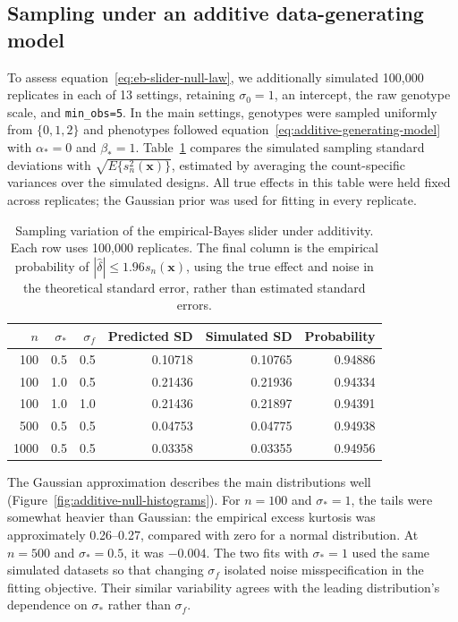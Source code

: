\documentclass[11pt]{article}
\begin{document}
\subsection{Sampling under an additive data-generating model}
\label{sec:additive-simulations}

To assess equation~\eqref{eq:eb-slider-null-law}, we additionally
simulated 100,000 replicates in each of 13 settings, retaining
$\sigma_0=1$, an intercept, the raw genotype scale, and
\texttt{min\_obs=5}. In the main settings, genotypes were sampled
uniformly from $\{0,1,2\}$ and phenotypes followed
equation~\eqref{eq:additive-generating-model} with
$\alpha_*=0$ and $\beta_*=1$. Table~\ref{tab:additive-null}
compares the simulated sampling standard deviations with
$\sqrt{E\{s_n^2(\mathbf x)\}}$, estimated by averaging the
count-specific variances over the simulated designs. All true
effects in this table were held fixed across replicates; the
Gaussian prior was used for fitting in every replicate.

\begin{table}[htbp]
\centering
\caption{Sampling variation of the empirical-Bayes slider under
additivity. Each row uses 100,000 replicates. The final column is
the empirical probability of
$|\widehat\delta|\leq1.96s_n(\mathbf x)$, using the true effect
and noise in the theoretical standard error, rather than estimated
standard errors.}
\label{tab:additive-null}
\begin{tabular}{rrrrrr}
\toprule
$n$ & $\sigma_*$ & $\sigma_f$ & Predicted SD & Simulated SD & Probability\\
\midrule
100  & 0.5 & 0.5 & 0.10718 & 0.10765 & 0.94886\\
100  & 1.0 & 0.5 & 0.21436 & 0.21936 & 0.94334\\
100  & 1.0 & 1.0 & 0.21436 & 0.21897 & 0.94391\\
500  & 0.5 & 0.5 & 0.04753 & 0.04775 & 0.94938\\
1000 & 0.5 & 0.5 & 0.03358 & 0.03355 & 0.94956\\
\bottomrule
\end{tabular}
\end{table}

The Gaussian approximation describes the main distributions well
(Figure~\ref{fig:additive-null-histograms}). For $n=100$ and
$\sigma_*=1$, the tails were somewhat heavier than Gaussian:
the empirical excess kurtosis was approximately 0.26--0.27,
compared with zero for a normal distribution. At $n=500$ and
$\sigma_*=0.5$, it was $-0.004$. The two fits with
$\sigma_*=1$ used the same simulated datasets so that changing
$\sigma_f$ isolated noise misspecification in the fitting objective.
Their similar variability agrees with the leading distribution's
dependence on $\sigma_*$ rather than $\sigma_f$.
\end{document}
